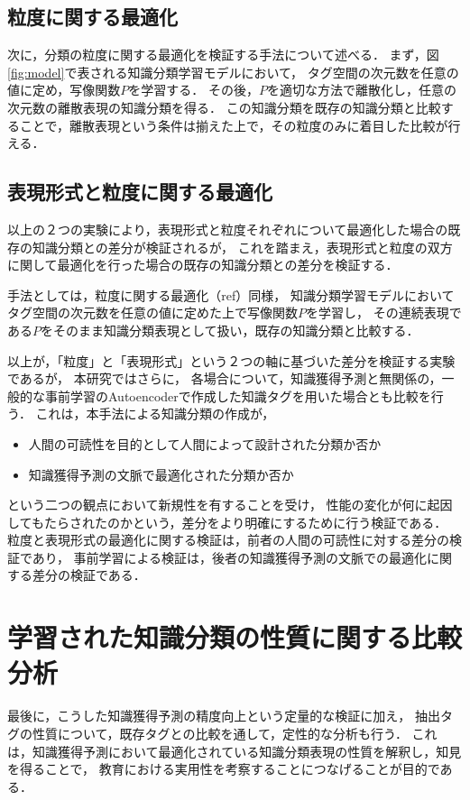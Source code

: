\subsection{粒度に関する最適化}
次に，分類の粒度に関する最適化を検証する手法について述べる．
まず，図\ref{fig:model}で表される知識分類学習モデルにおいて，
タグ空間の次元数を任意の値に定め，写像関数$P$を学習する．
その後，$P$を適切な方法で離散化し，任意の次元数の離散表現の知識分類を得る．
この知識分類を既存の知識分類と比較することで，離散表現という条件は揃えた上で，その粒度のみに着目した比較が行える．

\subsection{表現形式と粒度に関する最適化}
以上の２つの実験により，表現形式と粒度それぞれについて最適化した場合の既存の知識分類との差分が検証されるが，
これを踏まえ，表現形式と粒度の双方に関して最適化を行った場合の既存の知識分類との差分を検証する．

手法としては，粒度に関する最適化（ref）同様，
知識分類学習モデルにおいてタグ空間の次元数を任意の値に定めた上で写像関数$P$を学習し，
その連続表現である$P$をそのまま知識分類表現として扱い，既存の知識分類と比較する．

\vvspace
以上が，「粒度」と「表現形式」という２つの軸に基づいた差分を検証する実験であるが，
本研究ではさらに，
各場合について，知識獲得予測と無関係の，一般的な事前学習のAutoencoderで作成した知識タグを用いた場合とも比較を行う．
これは，本手法による知識分類の作成が，
\begin{itemize}
	\item 人間の可読性を目的として人間によって設計された分類か否か
	\item 知識獲得予測の文脈で最適化された分類か否か
\end{itemize}
という二つの観点において新規性を有することを受け，
性能の変化が何に起因してもたらされたのかという，差分をより明確にするために行う検証である．
粒度と表現形式の最適化に関する検証は，前者の人間の可読性に対する差分の検証であり，
事前学習による検証は，後者の知識獲得予測の文脈での最適化に関する差分の検証である．



\section{学習された知識分類の性質に関する比較分析}
最後に，こうした知識獲得予測の精度向上という定量的な検証に加え，
抽出タグの性質について，既存タグとの比較を通して，定性的な分析も行う．
これは，知識獲得予測において最適化されている知識分類表現の性質を解釈し，知見を得ることで，
教育における実用性を考察することにつなげることが目的である．

